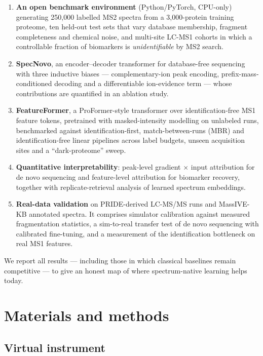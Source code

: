 \documentclass[
]{article}
\begin{document}
\begin{enumerate}
\def\labelenumi{\arabic{enumi}.}
\item
  \textbf{An open benchmark environment} (Python/PyTorch, CPU-only)
  generating 250,000 labelled MS2 spectra from a 3,000-protein training
  proteome, ten held-out test sets that vary database membership,
  fragment completeness and chemical noise, and multi-site LC-MS1
  cohorts in which a controllable fraction of biomarkers is
  \emph{unidentifiable} by MS2 search.
\item
  \textbf{SpecNovo}, an encoder--decoder transformer for database-free
  sequencing with three inductive biases --- complementary-ion peak
  encoding, prefix-mass-conditioned decoding and a differentiable
  ion-evidence term --- whose contributions are quantified in an
  ablation study.
\item
  \textbf{FeatureFormer}, a ProFormer-style transformer over
  identification-free MS1 feature tokens, pretrained with
  masked-intensity modelling on unlabeled runs, benchmarked against
  identification-first, match-between-runs (MBR) and identification-free
  linear pipelines across label budgets, unseen acquisition sites and a
  ``dark-proteome'' sweep.
\item
  \textbf{Quantitative interpretability}: peak-level gradient × input
  attribution for de novo sequencing and feature-level attribution for
  biomarker recovery, together with replicate-retrieval analysis of
  learned spectrum embeddings.
\item
  \textbf{Real-data validation} on PRIDE-derived LC-MS/MS runs and
  MassIVE-KB annotated spectra. It comprises simulator calibration
  against measured fragmentation statistics, a sim-to-real transfer test
  of de novo sequencing with calibrated fine-tuning, and a measurement
  of the identification bottleneck on real MS1 features.
\end{enumerate}

We report all results --- including those in which classical baselines
remain competitive --- to give an honest map of where spectrum-native
learning helps today.

\hypertarget{materials-and-methods}{%
\section{Materials and methods}\label{materials-and-methods}}

\hypertarget{virtual-instrument}{%
\subsection{Virtual instrument}\label{virtual-instrument}}
\end{document}
